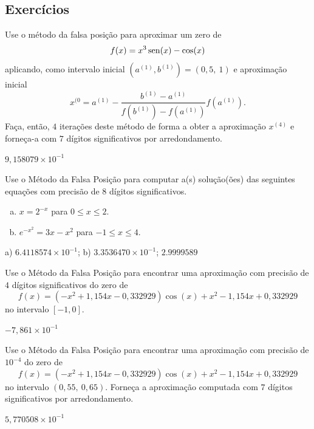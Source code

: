 \subsection{Exercícios}

\begin{exer}
  Use o método da falsa posição para aproximar um zero de
  \begin{equation}
    f(x)=x^3\operatorname{sen}(x)-\cos(x)
  \end{equation}
  aplicando, como intervalo inicial $(a^{(1)}, b^{(1)}) = (0,5, ~1)$ e aproximação inicial
  \begin{equation}
    x^{(0} = a^{(1)} - \frac{b^{(1)}-a^{(1)}}{f(b^{(1)})-f(a^{(1)})}f(a^{(1)}).
  \end{equation}
  Faça, então, $4$ iterações deste método de forma a obter a aproximação $x^{(4)}$ e forneça-a com $7$ dígitos significativos por arredondamento.
\end{exer}
\begin{resp}
  $9,158079\times 10^{-1}$
\end{resp}

\begin{exer}
  Use o Método da Falsa Posição para computar a(s) solução(ões) das seguintes equações com precisão de 8 dígitos significativos.
  \begin{enumerate}[a)]
  \item $x = 2^{-x}$ para $0\leq x \leq 2$.
  \item $e^{-x^2} = 3x - x^2$ para $-1\leq x\leq 4$.
  \end{enumerate}
\end{exer}
\begin{resp}
  a) $6.4118574\times 10^{-1}$; b) $3.3536470\times 10^{-1}$; $2.9999589$
\end{resp}

\begin{exer}
  Use o Método da Falsa Posição para encontrar uma aproximação com precisão de $4$ dígitos significativos do zero de 
  \begin{equation}
    f(x) = (-x^2+1,154x-0,332929)\cos(x) + x^2 - 1,154x + 0,332929
  \end{equation}
  no intervalo $[-1, 0]$.
\end{exer}
\begin{resp}
  $-7,861\times 10^{-1}$
\end{resp}

\begin{exer}
  Use o Método da Falsa Posição para encontrar uma aproximação com precisão de $10^{-4}$ do zero de
  \begin{equation}
    f(x) = (-x^2+1,154x-0,332929)\cos(x) + x^2 - 1,154x + 0,332929
  \end{equation}
no intervalo $(0,55, ~0,65)$. Forneça a aproximação computada com $7$ dígitos significativos por arredondamento.
\end{exer}
\begin{resp}
  $5,770508\times 10^{-1}$
\end{resp}

